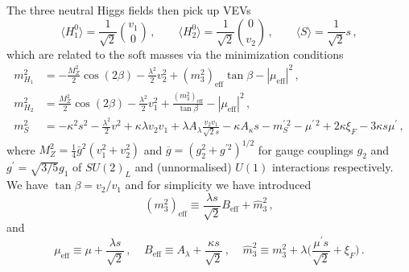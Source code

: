 \documentclass[final,3p,times]{elsarticle}
\newcommand{\be}{\begin{equation}}
\newcommand{\ee}{\end{equation}}
\newcommand{\ds}{\displaystyle}
\newcommand{\lamsq}{\lambda^2}
\begin{document}
\noindent The three neutral Higgs fields then pick up VEVs
%  
\be 
        \langle H_1^0 \rangle = \ds\frac{1}{\sqrt{2}}{v_1 \choose 0}\,, 
\qquad  \langle H_2^0 \rangle = \ds\frac{1}{\sqrt{2}}{0 \choose v_2}\,, 
\qquad  \langle S \rangle =  \ds\frac{1}{\sqrt{2}}s\,, 
\label{eq:potmin} 
\ee
%  
\noindent which are related to the soft masses via the minimization conditions
%
\begin{align}
m_{H_1}^2&= -\frac{M_Z^2}{2}\cos(2\beta) - \ds\frac{\lamsq}{2} v_2^2
 + (m_3^2)_\textrm{eff} \tan\beta 
- |\mu_\textrm{eff}|^2\,, \label{eq:mind}\\
m_{H_2}^2&= \frac{M_Z^2}{2}\cos(2\beta) - \ds\frac{\lamsq}{2}v_1^2 
+  \frac{(m_3^2)_\textrm{eff}}{\tan\beta} 
- |\mu_\textrm{eff}|^2 \,, \label{eq:minu} \\
m_S^2 &= -\kappa^2 s^2 - \ds\frac{\lamsq}{2} 
v^2 + \kappa\lambda v_2v_1
+ \lambda A_{\lambda} \frac{v_2v_1}{\sqrt{2}s}
-\kappa A_{\kappa}s  - m^{\prime \,2}_S - \mu^{\prime \,2} + 2 \kappa \xi_F  - 3 \kappa s \mu^\prime \,,
\label{eq:mins}
\end{align}
where $M_Z^2 = \tfrac{1}{4}\bar{g}^2(v_1^2+v_2^2)$ and $\overline{g} = (g_2^2+g^{\prime 2})^{1/2}$ 
for gauge couplings $g_2$ and $g^{\prime}=\sqrt{3/5}g_1$ of $SU(2)_L$ and (unnormalised) 
$U(1)$ interactions respectively.
%
We have $\tan \beta = v_2 /  v_1$ and for simplicity we have introduced
\be (m_3^2)_\textrm{eff} \equiv
 \ds\frac{ \lambda s}{\sqrt{2}} B_\textrm{eff} + \widehat{m}_3^2\,, \ee and
\be  \mu_\textrm{eff} \equiv
 \mu + \frac{\lambda s}{\sqrt{2}}\,, \;\;\;\; B_\textrm{eff}\equiv A_\lambda+\ds\frac{\kappa s}{\sqrt{2}}\,, \;\;\;\; \widehat{m}_3^2 \equiv m_3^2 + \lambda \Bigg(\ds\frac{\mu^\prime s}{\sqrt{2}} + \xi_F\Bigg)\,. \ee


 
\end{document}
